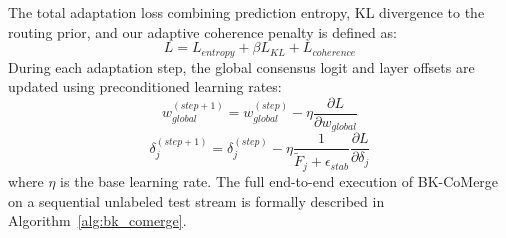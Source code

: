 \documentclass{article}
\theoremstyle{plain}
\theoremstyle{definition}
\theoremstyle{remark}
\begin{document}
The total adaptation loss combining prediction entropy, KL divergence to the routing prior, and our adaptive coherence penalty is defined as:
\begin{equation}
    L = L_{entropy} + \beta L_{KL} + L_{coherence}
\end{equation}
During each adaptation step, the global consensus logit and layer offsets are updated using preconditioned learning rates:
\begin{equation}
    w_{global}^{(step+1)} = w_{global}^{(step)} - \eta \frac{\partial L}{\partial w_{global}}
\end{equation}
\begin{equation}
    \delta_j^{(step+1)} = \delta_j^{(step)} - \eta \frac{1}{\tilde{F}_j + \epsilon_{stab}} \frac{\partial L}{\partial \delta_j}
\end{equation}
where $\eta$ is the base learning rate. The full end-to-end execution of BK-CoMerge on a sequential unlabeled test stream is formally described in Algorithm~\ref{alg:bk_comerge}.
\end{document}
